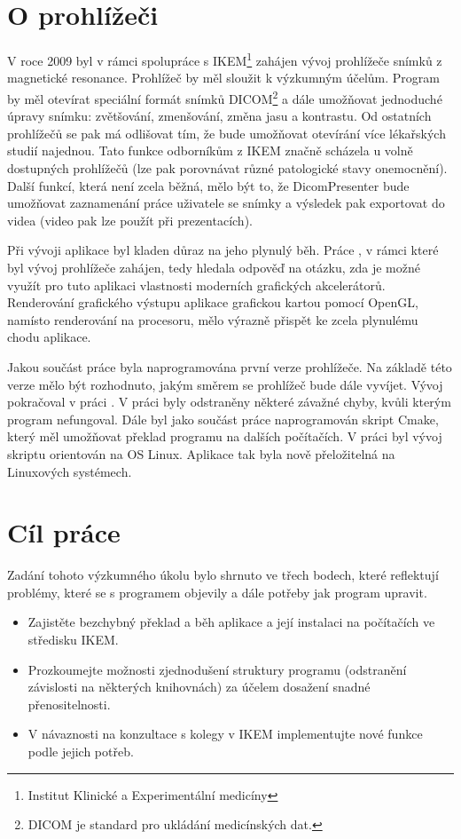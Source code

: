 \chapter{O prohlížeči}

V roce 2009 byl v rámci spolupráce s IKEM\footnote{Institut Klinické a Experimentální medicíny} zahájen vývoj prohlížeče snímků z magnetické resonance. Prohlížeč by měl sloužit k výzkumným účelům. Program by měl otevírat speciální formát snímků DICOM\footnote{DICOM je standard pro ukládání medicínských dat.} a dále umožňovat jednoduché úpravy snímku: zvětšování, zmenšování, změna jasu a kontrastu. Od ostatních prohlížečů se pak má odlišovat tím, že bude umožňovat otevírání více lékařských studií najednou. Tato funkce odborníkům z IKEM značně scházela u volně dostupných prohlížečů (lze pak porovnávat různé patologické stavy onemocnění). Další funkcí, která není zcela běžná, mělo být to, že DicomPresenter bude umožňovat zaznamenání práce uživatele se snímky a výsledek pak exportovat do videa (video pak lze použít při prezentacích).

Při vývoji aplikace byl kladen důraz na jeho plynulý běh. Práce \cite{neskudla}, v rámci které byl vývoj prohlížeče zahájen, tedy hledala odpověď na otázku, zda je možné využít pro tuto aplikaci vlastnosti moderních grafických akcelerátorů. Renderování grafického výstupu aplikace grafickou kartou pomocí OpenGL, namísto renderování na procesoru, mělo výrazně přispět ke zcela plynulému chodu aplikace.

Jakou součást práce \cite{neskudla} byla naprogramována první verze prohlížeče. Na základě této verze mělo být rozhodnuto, jakým směrem se prohlížeč bude dále vyvíjet. Vývoj pokračoval v práci \cite{flaska}. V práci byly odstraněny některé závažné chyby, kvůli kterým program nefungoval. Dále byl jako součást práce naprogramován skript Cmake, který měl umožňovat překlad programu na dalších počítačích. V práci byl vývoj skriptu orientován na OS Linux. Aplikace tak byla nově přeložitelná na Linuxových systémech.


\chapter{Cíl práce}
Zadání tohoto výzkumného úkolu bylo shrnuto ve třech bodech, které reflektují problémy, které se s programem objevily a dále potřeby jak program upravit.

\begin{itemize}
\item Zajistěte bezchybný překlad a běh aplikace a její instalaci na počítačích ve středisku IKEM.
\item Prozkoumejte možnosti zjednodušení struktury programu (odstranění závislosti na některých knihovnách) za účelem dosažení snadné přenositelnosti.
\item V návaznosti na konzultace s kolegy v IKEM implementujte nové funkce podle jejich potřeb.
\end{itemize}

